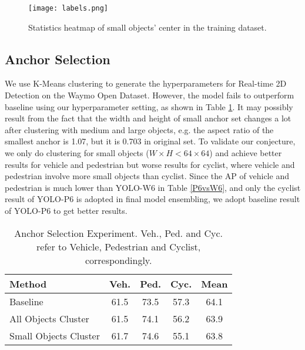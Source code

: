 \documentclass[final]{cvpr}
\begin{document}
\begin{figure}
    \centering
    \texttt{[image: labels.png]}
    \caption{Statistics heatmap of small objects' center in the training dataset.}
    \label{heatmap}
\end{figure}
\subsection{Anchor Selection}
We use K-Means clustering to generate the hyperparameters for Real-time 2D Detection on the Waymo Open Dataset. However, the model fails to outperform baseline using our hyperparameter setting, as shown in Table \ref{anchorselection}. It may possibly result from the fact that the width and height of small anchor set changes a lot after clustering with medium and large objects, e.g. the aspect ratio of the smallest anchor is 1.07, but it is 0.703 in original set. To validate our conjecture, we only do clustering for small objects ($W\times H<64\times 64$) and achieve better results for vehicle and pedestrian but worse results for cyclist, where vehicle and pedestrian involve more small objects than cyclist. Since the AP of vehicle and pedestrian is much lower than YOLO-W6 in Table \ref{P6vsW6}, and only the cyclist result of YOLO-P6 is adopted in final model ensembling, we adopt baseline result of YOLO-P6 to get better results.

\begin{table}[h]
\begin{center}
\caption{Anchor Selection Experiment. Veh., Ped. and Cyc. refer to Vehicle, Pedestrian and Cyclist, correspondingly.}
\begin{tabular}{l|c|c|c|c}
\hline
Method  & Veh. & Ped. & Cyc. & Mean \\
\hline
Baseline & 61.5 & 73.5 & 57.3 & 64.1  \\
All Objects Cluster & 61.5 & 74.1 & 56.2 & 63.9 \\
Small Objects Cluster & 61.7 & 74.6 & 55.1 & 63.8\\
\hline
\end{tabular}
\label{anchorselection}
\end{center}
\end{table}
\end{document}
